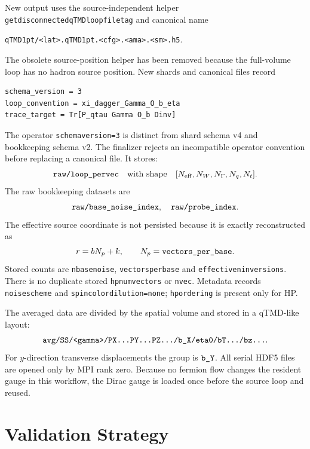 \documentclass[11pt,a4paper]{article}
\newcommand{\code}[1]{\texttt{\begingroup\def\_{\textunderscore\allowbreak}#1\endgroup}}
\begin{document}
New output uses the source-independent helper
\code{get\_disconnected\_qTMD\_loop\_file\_tag} and canonical name
\begin{center}
\code{qTMD1pt/<lat>.qTMD1pt.<cfg>.<ama>.<sm>.h5}.
\end{center}
The obsolete source-position helper has been removed because the full-volume
loop has no hadron source position. New shards and canonical files record
\begin{verbatim}
schema_version = 3
loop_convention = xi_dagger_Gamma_O_b_eta
trace_target = Tr[P_qtau Gamma O_b Dinv]
\end{verbatim}
The operator \code{schema\_version=3} is distinct from shard schema v4 and
bookkeeping schema v2. The finalizer rejects an incompatible operator
convention before replacing a canonical file. It stores:
\begin{equation}
  \code{raw/loop\_pervec}
  \quad\mathrm{with\ shape}\quad
  [N_{\mathrm{eff}}, N_W, N_\Gamma, N_q, N_t].
\end{equation}
The raw bookkeeping datasets are
\begin{equation}
  \code{raw/base\_noise\_index},\quad
  \code{raw/probe\_index}.
\end{equation}
The effective source coordinate is not persisted because it is exactly
reconstructed as
\begin{equation}
  r=bN_p+k,\qquad N_p=\code{vectors\_per\_base}.
\end{equation}
Stored counts are \code{n\_base\_noise}, \code{vectors\_per\_base} and
\code{effective\_n\_inversions}. There is no duplicate stored
\code{hp\_num\_vectors} or \code{n\_vec}. Metadata records
\code{noise\_scheme} and \code{spin\_color\_dilution=none};
\code{hp\_ordering} is present only for HP.

The averaged data are divided by the spatial volume and stored in a qTMD-like
layout:
\begin{equation}
  \code{avg/SS/<gamma>/PX...PY...PZ.../b\_X/eta0/bT.../bz...}.
\end{equation}
For \(y\)-direction transverse displacements the group is \(\code{b\_Y}\).
All serial HDF5 files are opened only by MPI rank zero.  Because no fermion
flow changes the resident gauge in this workflow, the Dirac gauge is loaded
once before the source loop and reused.

\section{Validation Strategy}
\end{document}

